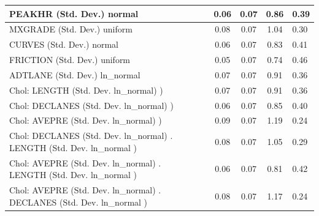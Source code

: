 \begin{table}
\begin{center}
\begin{tabular}{|l|l|c|c|c|l|}
			\hline
			PEAKHR (Std. Dev.) normal &  & 0.06 & 0.07 & 0.86 & 0.39 \\
			\hline
			MXGRADE (Std. Dev.) uniform &  & 0.08 & 0.07 & 1.04 & 0.30 \\
			\hline
			CURVES (Std. Dev.) normal &  & 0.06 & 0.07 & 0.83 & 0.41 \\
			\hline
			FRICTION (Std. Dev.) uniform &  & 0.05 & 0.07 & 0.74 & 0.46 \\
			\hline
			ADTLANE (Std. Dev.) ln_normal &  & 0.07 & 0.07 & 0.91 & 0.36 \\
			\hline
			 Chol: LENGTH (Std. Dev. ln_normal) ) &  & 0.07 & 0.07 & 0.91 & 0.36 \\
			\hline
			 Chol: DECLANES (Std. Dev. ln_normal) ) &  & 0.06 & 0.07 & 0.85 & 0.40 \\
			\hline
			 Chol: AVEPRE (Std. Dev. ln_normal) ) &  & 0.09 & 0.07 & 1.19 & 0.24 \\
			\hline
			 Chol: DECLANES (Std. Dev. ln_normal) . LENGTH (Std. Dev.   ln_normal ) &  & 0.08 & 0.07 & 1.05 & 0.29 \\
			\hline
			 Chol: AVEPRE (Std. Dev. ln_normal) . LENGTH (Std. Dev.   ln_normal ) &  & 0.06 & 0.07 & 0.81 & 0.42 \\
			\hline
			 Chol: AVEPRE (Std. Dev. ln_normal) . DECLANES (Std. Dev.   ln_normal ) &  & 0.08 & 0.07 & 1.17 & 0.24 \\
			\hline
		\end{tabular}
	\end{center}
\end{table}